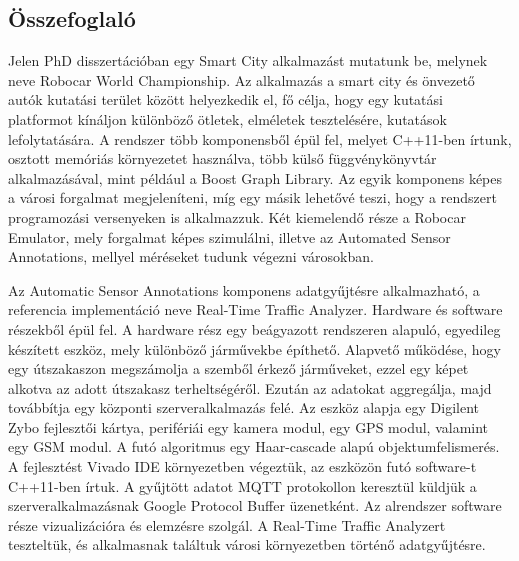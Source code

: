 \documentclass[b5paper,12pt]{report}
\theoremstyle{definition}
\begin{document}
\subsection*{Összefoglaló}
\begin{otherlanguage}{hungarian}
Jelen PhD disszertációban egy Smart City alkalmazást mutatunk be, melynek neve Robocar World Championship. Az alkalmazás a smart city és önvezető autók kutatási terület között helyezkedik el, fő célja, hogy egy kutatási platformot kínáljon különböző ötletek, elméletek tesztelésére, kutatások lefolytatására. A rendszer több komponensből épül fel, melyet C++11-ben írtunk, osztott memóriás környezetet használva, több külső függvénykönyvtár alkalmazásával, mint például a Boost Graph Library. Az egyik komponens képes a városi forgalmat megjeleníteni, míg egy másik lehetővé teszi, hogy a rendszert programozási versenyeken is alkalmazzuk. Két kiemelendő része a Robocar Emulator, mely forgalmat képes szimulálni, illetve az Automated Sensor Annotations, mellyel méréseket tudunk végezni városokban.

Az Automatic Sensor Annotations komponens adatgyűjtésre alkalmazható, a referencia implementáció neve Real-Time Traffic Analyzer. Hardware és software részekből épül fel. A hardware rész egy beágyazott rendszeren alapuló, egyedileg készített eszköz, mely különböző járművekbe építhető. Alapvető működése, hogy egy útszakaszon megszámolja a szemből érkező járműveket, ezzel egy képet alkotva az adott útszakasz terheltségéről. Ezután az adatokat aggregálja, majd továbbítja egy központi szerveralkalmazás felé. Az eszköz alapja egy Digilent Zybo fejlesztői kártya, perifériái egy kamera modul, egy GPS modul, valamint egy GSM modul. A futó algoritmus egy Haar-cascade alapú objektumfelismerés. A fejlesztést Vivado IDE környezetben végeztük, az eszközön futó software-t C++11-ben írtuk. A gyűjtött adatot MQTT protokollon keresztül küldjük a szerveralkalmazásnak Google Protocol Buffer üzenetként. Az alrendszer software része vizualizációra és elemzésre szolgál. A Real-Time Traffic Analyzert teszteltük, és alkalmasnak találtuk városi környezetben történő adatgyűjtésre.


\end{otherlanguage}
\end{document}
